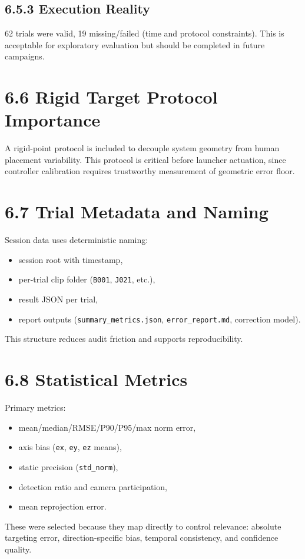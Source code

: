 \subsection{6.5.3 Execution Reality}
62 trials were valid, 19 missing/failed (time and protocol constraints). This is acceptable for exploratory evaluation but should be completed in future campaigns.

\section{6.6 Rigid Target Protocol Importance}
A rigid-point protocol is included to decouple system geometry from human placement variability. This protocol is critical before launcher actuation, since controller calibration requires trustworthy measurement of geometric error floor.

\section{6.7 Trial Metadata and Naming}
Session data uses deterministic naming:
\begin{itemize}
  \item session root with timestamp,
  \item per-trial clip folder (\texttt{B001}, \texttt{J021}, etc.),
  \item result JSON per trial,
  \item report outputs (\texttt{summary\_metrics.json}, \texttt{error\_report.md}, correction model).
\end{itemize}

This structure reduces audit friction and supports reproducibility.

\section{6.8 Statistical Metrics}
Primary metrics:
\begin{itemize}
  \item mean/median/RMSE/P90/P95/max norm error,
  \item axis bias (\texttt{ex}, \texttt{ey}, \texttt{ez} means),
  \item static precision (\texttt{std\_norm}),
  \item detection ratio and camera participation,
  \item mean reprojection error.
\end{itemize}

These were selected because they map directly to control relevance: absolute targeting error, direction-specific bias, temporal consistency, and confidence quality.

